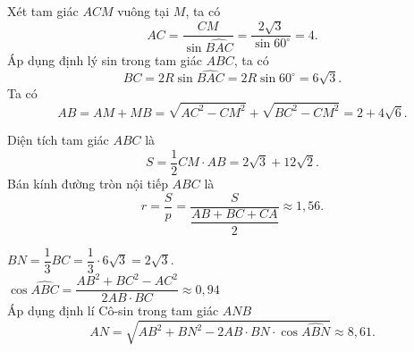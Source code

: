 \begin{bt}
{\begin{center}
\begin{tikzpicture}[line join = round, line cap = round,>=stealth,font=\footnotesize,scale=1]
			\end{tikzpicture}
		\end{center}
		\begin{listEX}[1]
			\item Xét tam giác $ ACM $ vuông tại $ M $, ta có
			\[ AC= \dfrac{CM }{\sin \widehat{BAC}}=\dfrac{2\sqrt{3}}{\sin 60^\circ}=4. \]
			Áp dụng định lý  sin  trong tam giác $ ABC $, ta có
			\[ BC=2R\sin{\widehat{BAC}}=2R\sin 60^\circ=6\sqrt{3}. \]
			Ta có 
			\[ AB=AM+MB=\sqrt{AC^2-CM^2}+\sqrt{BC^2-CM^2}=2+4\sqrt{6}. \]
			\item Diện tích tam giác $ ABC $ là 
			$$ S=\dfrac{1}{2} CM \cdot AB = 2\sqrt{3}+12\sqrt{2} .$$
			Bán kính đường tròn nội tiếp $ ABC $ là 
			\[ r=\dfrac{S}{p}=\dfrac{S}{\dfrac{AB+BC+CA}{2}} \approx 1{,}56. \]
			\item $ BN=\dfrac{1}{3}BC=\dfrac{1}{3}\cdot 6\sqrt{3}=2\sqrt{3}$.\\
			$\cos \widehat{ABC} = \dfrac{AB^2 + BC^2 - AC^2}{2 AB \cdot BC} \approx 0,94 $\\
			Áp dụng định lí Cô-sin trong tam giác $ANB$
			\[ AN = \sqrt{AB^2 + BN^2 - 2AB\cdot BN\cdot\cos \widehat{ABN}} \approx 8,61. \]
		\end{listEX}
	}
\end{bt}